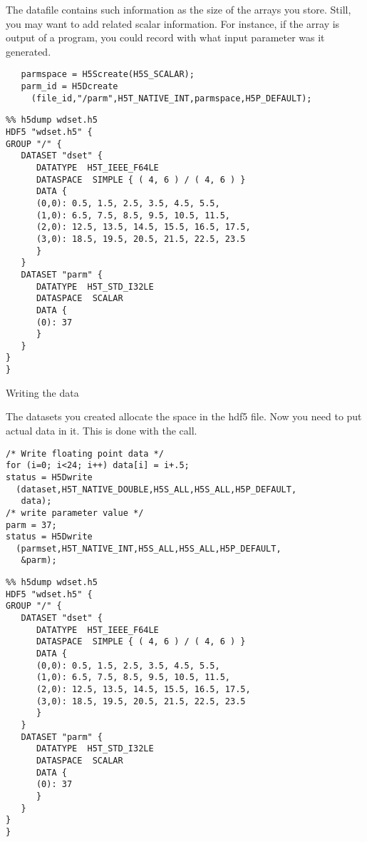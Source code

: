 The datafile contains such information as the size of the arrays you
store. Still, you may want to add related scalar information. For
instance, if the array is output of a program, you could record
with what input
parameter was it generated.

\begin{verbatim}
   parmspace = H5Screate(H5S_SCALAR);
   parm_id = H5Dcreate
     (file_id,"/parm",H5T_NATIVE_INT,parmspace,H5P_DEFAULT);
\end{verbatim}




\begin{verbatim}
%% h5dump wdset.h5 
HDF5 "wdset.h5" {
GROUP "/" {
   DATASET "dset" {
      DATATYPE  H5T_IEEE_F64LE
      DATASPACE  SIMPLE { ( 4, 6 ) / ( 4, 6 ) }
      DATA {
      (0,0): 0.5, 1.5, 2.5, 3.5, 4.5, 5.5,
      (1,0): 6.5, 7.5, 8.5, 9.5, 10.5, 11.5,
      (2,0): 12.5, 13.5, 14.5, 15.5, 16.5, 17.5,
      (3,0): 18.5, 19.5, 20.5, 21.5, 22.5, 23.5
      }
   }
   DATASET "parm" {
      DATATYPE  H5T_STD_I32LE
      DATASPACE  SCALAR
      DATA {
      (0): 37
      }
   }
}
}
\end{verbatim}

 {Writing the data}

The datasets you created allocate the space in the hdf5 file. Now you
need to put actual data in it. This is done with the  call.

\begin{verbatim}
/* Write floating point data */
for (i=0; i<24; i++) data[i] = i+.5;
status = H5Dwrite
  (dataset,H5T_NATIVE_DOUBLE,H5S_ALL,H5S_ALL,H5P_DEFAULT,
   data); 
/* write parameter value */
parm = 37;
status = H5Dwrite
  (parmset,H5T_NATIVE_INT,H5S_ALL,H5S_ALL,H5P_DEFAULT,
   &parm);
\end{verbatim}



\begin{verbatim}
%% h5dump wdset.h5     
HDF5 "wdset.h5" {
GROUP "/" {
   DATASET "dset" {
      DATATYPE  H5T_IEEE_F64LE
      DATASPACE  SIMPLE { ( 4, 6 ) / ( 4, 6 ) }
      DATA {
      (0,0): 0.5, 1.5, 2.5, 3.5, 4.5, 5.5,
      (1,0): 6.5, 7.5, 8.5, 9.5, 10.5, 11.5,
      (2,0): 12.5, 13.5, 14.5, 15.5, 16.5, 17.5,
      (3,0): 18.5, 19.5, 20.5, 21.5, 22.5, 23.5
      }
   }
   DATASET "parm" {
      DATATYPE  H5T_STD_I32LE
      DATASPACE  SCALAR
      DATA {
      (0): 37
      }
   }
}
}
\end{verbatim}

